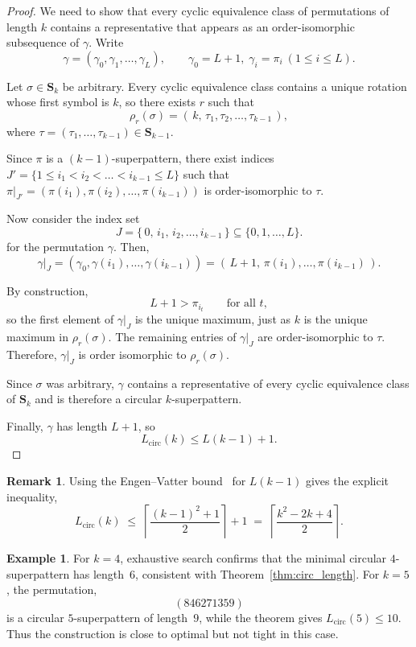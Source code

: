 \documentclass[a4paper,12pt]{article}
\theoremstyle{definition}
\newtheorem{eg}[theorem]{Example}
\newtheorem{rem}[theorem]{Remark}
\numberwithin{equation}{section}
\begin{document}
\begin{proof}
We need to show that every cyclic equivalence class of permutations of length $k$ contains a representative that appears as an order-isomorphic subsequence of $\gamma$.
Write
\[
\gamma = (\gamma_0, \gamma_1, \dots, \gamma_L),
\qquad 
\gamma_0 = L+1,\; \gamma_i = \pi_i \ (1 \le i \le L).
\]

Let $\sigma \in \mathbf{S}_k$ be arbitrary.  
Every cyclic equivalence class contains a unique rotation whose first symbol is $k$, so there exists $r$ such that
\[
\rho_r(\sigma) = (\,k,\, \tau_1, \tau_2, \dots, \tau_{k-1}\,),
\]
where $\tau = (\tau_1,\dots,\tau_{k-1}) \in \mathbf{S}_{k-1}$.

Since $\pi$ is a $(k-1)$-superpattern, there exist indices $J'=\{1 \le i_1 < i_2 < \dots < i_{k-1} \le L\}$ such that $\pi|_{J'}=(\pi(i_1), \pi({i_2}), \dots, \pi({i_{k-1}}))$ is order-isomorphic to $\tau$.

Now consider the index set
\[
J = \{\,0,\, i_1,\, i_2, \dots, i_{k-1}\,\}
\subseteq \{0,1,\dots,L\}.
\]
for the permutation $\gamma$. Then,
\[
\gamma|_J
   = (\gamma_0, \gamma({i_1}), \dots, \gamma({i_{k-1}}))
   = (\,L+1,\, \pi({i_1}), \dots, \pi({i_{k-1}})\,).
\]

By construction,
\[
L+1 > \pi_{i_t} \qquad \text{for all } t,
\]
so the first element of $\gamma|_J$ is the unique maximum, just as $k$ is the unique maximum in $\rho_r(\sigma)$.  
The remaining entries of $\gamma|_J$ are order-isomorphic to $\tau$.  
Therefore, $\gamma|_J$ is order isomorphic to $\rho_r(\sigma).$

Since $\sigma$ was arbitrary, $\gamma$ contains a representative of every cyclic equivalence class of $\mathbf{S}_k$ and is therefore a circular $k$-superpattern.

Finally, $\gamma$ has length $L+1$, so
\[
L_{\mathrm{circ}}(k) \le L(k-1) + 1.
\]
\end{proof}

\begin{rem}
    Using the Engen–Vatter bound~\cite{engen2020containing} for $L(k-1)$ gives the explicit inequality,
\[
L_{\mathrm{circ}}(k)
   \;\le\; \left\lceil \frac{(k-1)^2 + 1}{2} \right\rceil + 1
   \;=\; \left\lceil \frac{k^2 - 2k + 4}{2} \right\rceil .
\] 
\end{rem}
\begin{eg}
For $k = 4$, exhaustive search confirms that the minimal circular $4$-superpattern has length~$6$, consistent with Theorem~\ref{thm:circ_length}.  
For $k = 5$, the permutation,
\[
(846271359)
\]
is a circular $5$-superpattern of length~$9$, while the theorem gives $L_{\mathrm{circ}}(5) \le 10$.  
Thus the construction is close to optimal but not tight in this case.
\end{eg}
\end{document}
